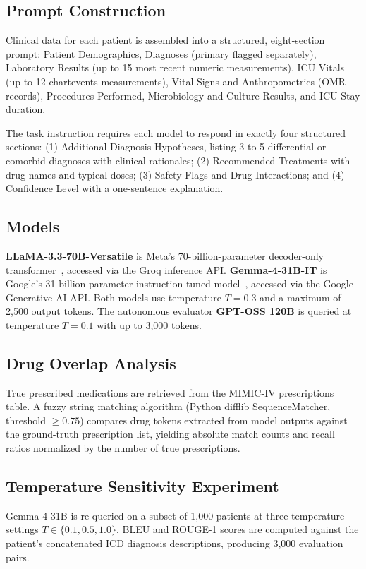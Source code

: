\documentclass[10pt, twocolumn, a4paper]{article}
\begin{document}
\subsection{Prompt Construction}
Clinical data for each patient is assembled into a structured, eight-section prompt: Patient Demographics, Diagnoses (primary flagged separately), Laboratory Results (up to 15 most recent numeric measurements), ICU Vitals (up to 12 chartevents measurements), Vital Signs and Anthropometrics (OMR records), Procedures Performed, Microbiology and Culture Results, and ICU Stay duration.

The task instruction requires each model to respond in exactly four structured sections: (1) Additional Diagnosis Hypotheses, listing 3 to 5 differential or comorbid diagnoses with clinical rationales; (2) Recommended Treatments with drug names and typical doses; (3) Safety Flags and Drug Interactions; and (4) Confidence Level with a one-sentence explanation.

\subsection{Models}
\textbf{LLaMA-3.3-70B-Versatile} is Meta's 70-billion-parameter decoder-only transformer~\cite{llama3}, accessed via the Groq inference API. \textbf{Gemma-4-31B-IT} is Google's 31-billion-parameter instruction-tuned model~\cite{gemma}, accessed via the Google Generative AI API. Both models use temperature $T = 0.3$ and a maximum of 2,500 output tokens. The autonomous evaluator \textbf{GPT-OSS 120B} is queried at temperature $T = 0.1$ with up to 3,000 tokens.

\subsection{Drug Overlap Analysis}
True prescribed medications are retrieved from the MIMIC-IV prescriptions table. A fuzzy string matching algorithm (Python difflib SequenceMatcher, threshold $\geq 0.75$) compares drug tokens extracted from model outputs against the ground-truth prescription list, yielding absolute match counts and recall ratios normalized by the number of true prescriptions.

\subsection{Temperature Sensitivity Experiment}
Gemma-4-31B is re-queried on a subset of 1,000 patients at three temperature settings $T \in \{0.1, 0.5, 1.0\}$. BLEU and ROUGE-1 scores are computed against the patient's concatenated ICD diagnosis descriptions, producing 3,000 evaluation pairs.
\end{document}
